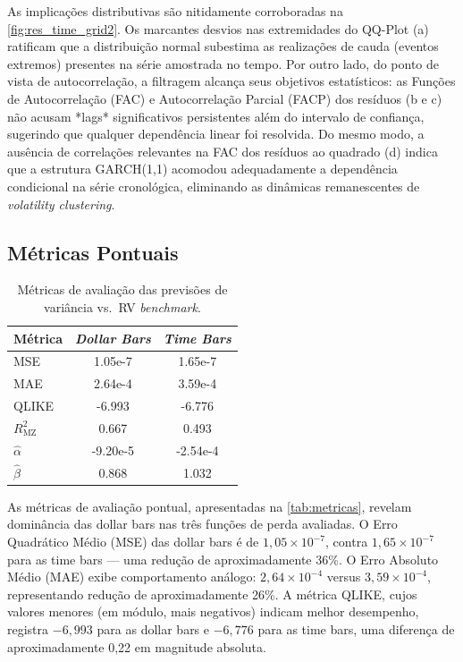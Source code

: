 As implicações distributivas são nitidamente corroboradas na \autoref{fig:res_time_grid2}. Os marcantes desvios nas extremidades do QQ-Plot (a) ratificam que a distribuição normal subestima as realizações de cauda (eventos extremos) presentes na série amostrada no tempo. Por outro lado, do ponto de vista de autocorrelação, a filtragem alcança seus objetivos estatísticos: as Funções de Autocorrelação (FAC) e Autocorrelação Parcial (FACP) dos resíduos (b e c) não acusam *lags* significativos persistentes além do intervalo de confiança, sugerindo que qualquer dependência linear foi resolvida. Do mesmo modo, a ausência de correlações relevantes na FAC dos resíduos ao quadrado (d) indica que a estrutura GARCH(1,1) acomodou adequadamente a dependência condicional na série cronológica, eliminando as dinâmicas remanescentes de \textit{volatility clustering}.

\subsection{Métricas Pontuais}
\label{subsec:metricas_pontuais}

\begin{table}[H]
\centering
\caption{Métricas de avaliação das previsões de variância vs.\ RV
\emph{benchmark}.}
\label{tab:metricas}
\begin{tabular}{lSS}
\toprule
{Métrica} & {\emph{Dollar Bars}} & {\emph{Time Bars}} \\
\midrule
MSE               & 1.05e-7  & 1.65e-7  \\
MAE               & 2.64e-4  & 3.59e-4  \\
QLIKE             & -6.993   & -6.776   \\
$R^2_{\text{MZ}}$ & 0.667    & 0.493    \\
$\hat{\alpha}$    & -9.20e-5 & -2.54e-4 \\
$\hat{\beta}$     & 0.868    & 1.032    \\
\bottomrule
\end{tabular}
\end{table}

As métricas de avaliação pontual, apresentadas na \autoref{tab:metricas},
revelam dominância das dollar bars nas três funções de perda avaliadas. O Erro Quadrático
Médio (MSE) das dollar bars é de $1{,}05 \times 10^{-7}$, contra $1{,}65 \times 10^{-7}$
para as time bars — uma redução de aproximadamente 36\%. O Erro Absoluto Médio (MAE)
exibe comportamento análogo: $2{,}64 \times 10^{-4}$ versus $3{,}59 \times 10^{-4}$,
representando redução de aproximadamente 26\%. A métrica QLIKE, cujos valores menores
(em módulo, mais negativos) indicam melhor desempenho, registra $-6{,}993$ para as dollar
bars e $-6{,}776$ para as time bars, uma diferença de aproximadamente 0,22 em magnitude absoluta.


